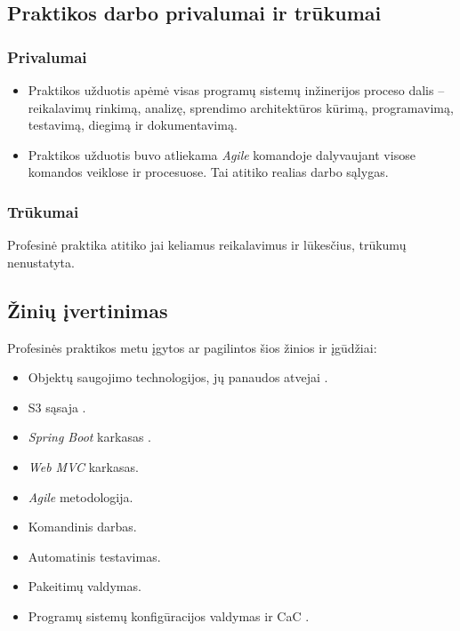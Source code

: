 \subsection{Praktikos darbo privalumai ir trūkumai}

\subsubsection*{Privalumai}
\begin{itemize}
    \item Praktikos užduotis apėmė visas programų sistemų inžinerijos proceso dalis -- reikalavimų rinkimą, analizę, sprendimo architektūros kūrimą, programavimą, testavimą, diegimą ir dokumentavimą.
    \item Praktikos užduotis buvo atliekama \textit{Agile} komandoje dalyvaujant visose komandos veiklose ir procesuose. Tai atitiko realias darbo sąlygas.
\end{itemize}

\subsubsection*{Trūkumai}

Profesinė praktika atitiko jai keliamus reikalavimus ir lūkesčius, trūkumų nenustatyta.

\subsection{Žinių įvertinimas}
Profesinės praktikos metu įgytos ar pagilintos šios žinios ir įgūdžiai:
\begin{itemize}
    \item Objektų saugojimo  technologijos, jų panaudos atvejai .
    \item S3 sąsaja .
    \item \textit{Spring Boot} karkasas .
    \item \textit{Web MVC} karkasas.
    \item \textit{Agile} metodologija.
    \item Komandinis darbas.
    \item Automatinis testavimas.
    \item Pakeitimų valdymas.
    \item Programų sistemų konfigūracijos valdymas ir CaC .
\end{itemize}

